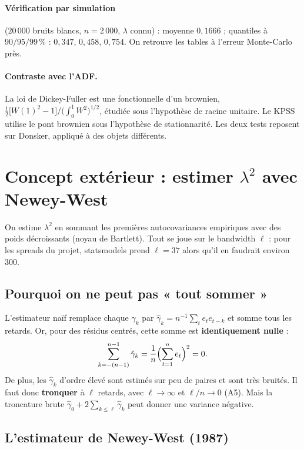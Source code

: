 \documentclass[11pt,a4paper]{article}
\theoremstyle{definition}
\begin{document}
\paragraph{Vérification par simulation} ($20\,000$ bruits blancs, $n = 2\,000$, $\lambda$ connu) : moyenne $0{,}1666$ ; quantiles à $90/95/99\,\%$ : $0{,}347$, $0{,}458$, $0{,}754$. On retrouve les tables à l'erreur Monte-Carlo près.

\paragraph{Contraste avec l'ADF.} La loi de Dickey-Fuller est une fonctionnelle d'un brownien,
$\tfrac12\bigl[W(1)^2 - 1\bigr]\big/\bigl(\int_0^1 W^2\bigr)^{1/2}$, étudiée sous l'hypothèse de racine unitaire. Le KPSS utilise le pont brownien sous l'hypothèse de stationnarité. Les deux tests reposent sur Donsker, appliqué à des objets différents.

\section{Concept extérieur : estimer \texorpdfstring{$\lambda^2$}{lambda²} avec Newey-West}\label{sec:nw}

On estime $\lambda^2$ en sommant les premières autocovariances empiriques avec des poids décroissants (noyau de Bartlett). Tout se joue sur le bandwidth $\ell$ : pour les spreads du projet, statsmodels prend $\ell = 37$ alors qu'il en faudrait environ $300$.

\subsection{Pourquoi on ne peut pas « tout sommer »}

L'estimateur naïf remplace chaque $\gamma_k$ par $\hat\gamma_k = n^{-1}\sum_{t} e_t e_{t-k}$ et somme tous les retards. Or, pour des résidus centrés, cette somme est \textbf{identiquement nulle} :
\[
\sum_{k=-(n-1)}^{n-1}\hat\gamma_k = \frac{1}{n}\Bigl(\sum_{t=1}^{n}e_t\Bigr)^2 = 0 .
\]
De plus, les $\hat\gamma_k$ d'ordre élevé sont estimés sur peu de paires et sont très bruités. Il faut donc \textbf{tronquer} à $\ell$ retards, avec $\ell \to \infty$ et $\ell/n \to 0$ (A5). Mais la troncature brute $\hat\gamma_0 + 2\sum_{k\le\ell}\hat\gamma_k$ peut donner une variance négative.

\subsection{L'estimateur de Newey-West (1987)}
\end{document}
